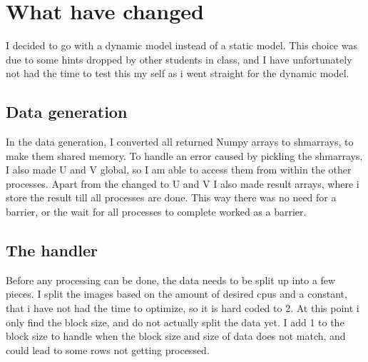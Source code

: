 \documentclass{Article}
\begin{document}
\section{What have changed}
I decided to go with a dynamic model instead of a static model. This choice was due to some hints dropped by other students in class, and I have unfortunately not had the time to test this my self as i went straight for the dynamic model.


\subsection{Data generation}
In the data generation, I converted all returned Numpy arrays to shmarrays, to make them shared memory. To handle an error caused by pickling the shmarrays, I also made U and V global, so I am able to access them from within the other processes. Apart from the changed to U and V I also made result arrays, where i store the result till all processes are done. This way there was no need for a barrier, or the wait for all processes to complete worked as a barrier.

\subsection{The handler}
Before any processing can be done, the data needs to be split up into a few pieces. I split the images based on the amount of desired cpus and a constant, that i have not had the time to optimize, so it is hard coded to 2. At this point i only find the block size, and do not actually split the data yet. I add 1 to the block size to handle when the block size and size of data does not match, and could lead to some rows not getting processed.
\end{document}
